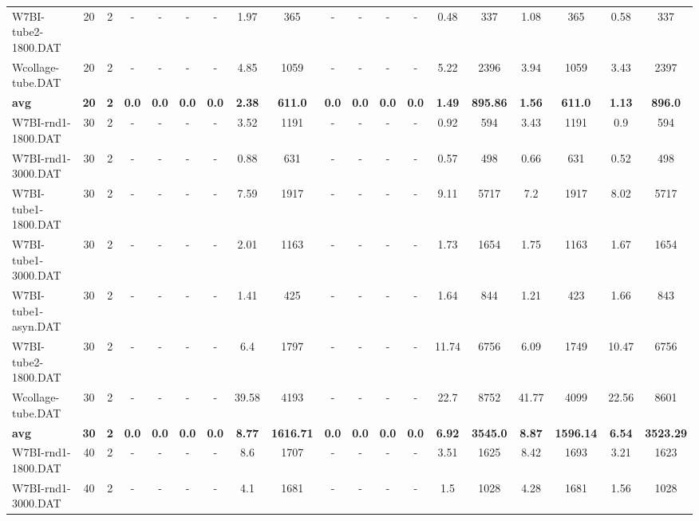 \begin{sidewaystable}[!ht]
{\begin{tabular}{lcccccccccccccccccc}
W7BI-tube2-1800.DAT & 20 & 2 &  - &  - &  - &  - & 1.97 & 365 &  - &  - &  - &  - &  \textcolor{blue2}{0.48} & 337 & 1.08 & 365 & 0.58 & 337 \\
Wcollage-tube.DAT & 20 & 2 &  - &  - &  - &  - & 4.85 & 1059 &  - &  - &  - &  - & 5.22 & 2396 & 3.94 & 1059 &  \textcolor{blue2}{3.43} & 2397 \\
\cline{1-19} \textbf{avg} & \textbf{20} & \textbf{2} & \textbf{0.0} & \textbf{0.0} & \textbf{0.0} & \textbf{0.0} & \textbf{2.38} & \textbf{611.0} & \textbf{0.0} & \textbf{0.0} & \textbf{0.0} & \textbf{0.0} & \textbf{1.49} & \textbf{895.86} & \textbf{1.56} & \textbf{611.0} & \textbf{1.13} & \textbf{896.0} \\ \cline{1-19}
W7BI-rnd1-1800.DAT & 30 & 2 &  - &  - &  - &  - & 3.52 & 1191 &  - &  - &  - &  - & 0.92 & 594 & 3.43 & 1191 &  \textcolor{blue2}{0.9} & 594 \\
W7BI-rnd1-3000.DAT & 30 & 2 &  - &  - &  - &  - & 0.88 & 631 &  - &  - &  - &  - & 0.57 & 498 & 0.66 & 631 &  \textcolor{blue2}{0.52} & 498 \\
W7BI-tube1-1800.DAT & 30 & 2 &  - &  - &  - &  - & 7.59 & 1917 &  - &  - &  - &  - & 9.11 & 5717 &  \textcolor{blue2}{7.2} & 1917 & 8.02 & 5717 \\
W7BI-tube1-3000.DAT & 30 & 2 &  - &  - &  - &  - & 2.01 & 1163 &  - &  - &  - &  - & 1.73 & 1654 & 1.75 & 1163 &  \textcolor{blue2}{1.67} & 1654 \\
W7BI-tube1-asyn.DAT & 30 & 2 &  - &  - &  - &  - & 1.41 & 425 &  - &  - &  - &  - & 1.64 & 844 &  \textcolor{blue2}{1.21} & 423 & 1.66 & 843 \\
W7BI-tube2-1800.DAT & 30 & 2 &  - &  - &  - &  - & 6.4 & 1797 &  - &  - &  - &  - & 11.74 & 6756 &  \textcolor{blue2}{6.09} & 1749 & 10.47 & 6756 \\
Wcollage-tube.DAT & 30 & 2 &  - &  - &  - &  - & 39.58 & 4193 &  - &  - &  - &  - & 22.7 & 8752 & 41.77 & 4099 &  \textcolor{blue2}{22.56} & 8601 \\
\cline{1-19} \textbf{avg} & \textbf{30} & \textbf{2} & \textbf{0.0} & \textbf{0.0} & \textbf{0.0} & \textbf{0.0} & \textbf{8.77} & \textbf{1616.71} & \textbf{0.0} & \textbf{0.0} & \textbf{0.0} & \textbf{0.0} & \textbf{6.92} & \textbf{3545.0} & \textbf{8.87} & \textbf{1596.14} & \textbf{6.54} & \textbf{3523.29} \\ \cline{1-19}
W7BI-rnd1-1800.DAT & 40 & 2 &  - &  - &  - &  - & 8.6 & 1707 &  - &  - &  - &  - & 3.51 & 1625 & 8.42 & 1693 &  \textcolor{blue2}{3.21} & 1623 \\
W7BI-rnd1-3000.DAT & 40 & 2 &  - &  - &  - &  - & 4.1 & 1681 &  - &  - &  - &  - &  \textcolor{blue2}{1.5} & 1028 & 4.28 & 1681 & 1.56 & 1028 \\

\end{tabular}}
\end{sidewaystable}
